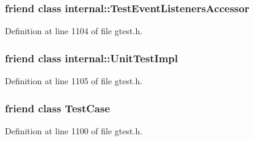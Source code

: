 \subsubsection[{\texorpdfstring{internal\+::\+Test\+Event\+Listeners\+Accessor}{internal::TestEventListenersAccessor}}]{\setlength{\rightskip}{0pt plus 5cm}friend class {\bf internal\+::\+Test\+Event\+Listeners\+Accessor}\hspace{0.3cm}{\ttfamily [friend]}}\hypertarget{classtesting_1_1_test_event_listeners_addbc107b6b445617c880182bd4f44cf9}{}\label{classtesting_1_1_test_event_listeners_addbc107b6b445617c880182bd4f44cf9}


Definition at line 1104 of file gtest.\+h.

\subsubsection[{\texorpdfstring{internal\+::\+Unit\+Test\+Impl}{internal::UnitTestImpl}}]{\setlength{\rightskip}{0pt plus 5cm}friend class {\bf internal\+::\+Unit\+Test\+Impl}\hspace{0.3cm}{\ttfamily [friend]}}\hypertarget{classtesting_1_1_test_event_listeners_acc0a5e7573fd6ae7ad1878613bb86853}{}\label{classtesting_1_1_test_event_listeners_acc0a5e7573fd6ae7ad1878613bb86853}


Definition at line 1105 of file gtest.\+h.

\subsubsection[{\texorpdfstring{Test\+Case}{TestCase}}]{\setlength{\rightskip}{0pt plus 5cm}friend class {\bf Test\+Case}\hspace{0.3cm}{\ttfamily [friend]}}\hypertarget{classtesting_1_1_test_event_listeners_aff779e55b06adfa7c0088bd10253f0f0}{}\label{classtesting_1_1_test_event_listeners_aff779e55b06adfa7c0088bd10253f0f0}


Definition at line 1100 of file gtest.\+h.

